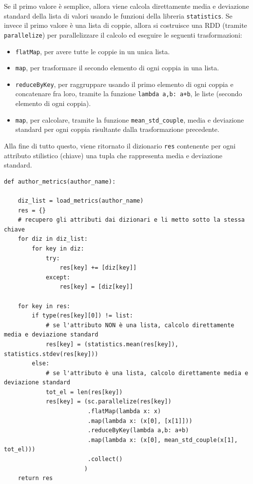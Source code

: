 \documentclass[titlepage]{article}
\begin{document}
\noindent
Se il primo valore è semplice, allora viene calcola direttamente media e deviazione standard della lista di valori usando le funzioni della libreria \texttt{statistics}. Se invece il primo valore è una lista di coppie, allora si costruisce una RDD (tramite \texttt{parallelize}) per parallelizzare il calcolo ed eseguire le seguenti trasformazioni:
\begin{itemize}
    \item \texttt{flatMap}, per avere tutte le coppie in un unica lista.
    \item \texttt{map}, per trasformare il secondo elemento di ogni coppia in una lista.
    \item \texttt{reduceByKey}, per raggruppare usando il primo elemento di ogni coppia e concatenare fra loro, tramite la funzione \texttt{lambda a,b: a+b}, le liste (secondo elemento di ogni coppia).
    \item \texttt{map}, per calcolare, tramite la funzione \texttt{mean\_std\_couple}, media e deviazione standard per ogni coppia risultante dalla trasformazione precedente.
\end{itemize}
Alla fine di tutto questo, viene ritornato il dizionario \texttt{res} contenente per ogni attributo stilistico (chiave) una tupla che rappresenta media e deviazione standard.
\begin{verbatim}
def author_metrics(author_name):

    diz_list = load_metrics(author_name)
    res = {}
    # recupero gli attributi dai dizionari e li metto sotto la stessa chiave
    for diz in diz_list:
        for key in diz:
            try:
                res[key] += [diz[key]]
            except:
                res[key] = [diz[key]]
                
    for key in res:
        if type(res[key][0]) != list:
            # se l'attributo NON è una lista, calcolo direttamente media e deviazione standard
            res[key] = (statistics.mean(res[key]), statistics.stdev(res[key]))
        else:
            # se l'attributo è una lista, calcolo direttamente media e deviazione standard
            tot_el = len(res[key])
            res[key] = (sc.parallelize(res[key])
                        .flatMap(lambda x: x)
                        .map(lambda x: (x[0], [x[1]]))
                        .reduceByKey(lambda a,b: a+b)
                        .map(lambda x: (x[0], mean_std_couple(x[1], tot_el)))
                        .collect()
                       )
    return res
\end{verbatim}
\end{document}
